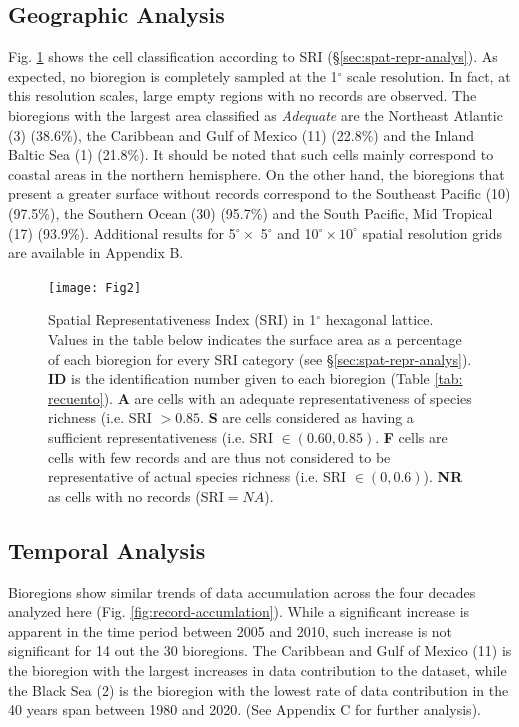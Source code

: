 \documentclass[12pt,authoryear]{elsarticle}
\begin{document}
\subsection{Geographic Analysis}

Fig. \ref{fig:cell_map} shows the cell classification according to SRI (\S \ref{sec:spat-repr-analys}). As expected, no bioregion is completely sampled at the 1$^\circ$ scale resolution. In fact, at this resolution scales, large empty regions with no records are observed. The bioregions with the largest area classified as \textit{Adequate} are the Northeast Atlantic (3) (38.6\%), the Caribbean and Gulf of Mexico (11) (22.8\%) and the Inland Baltic Sea (1) (21.8\%). It should be noted that such cells mainly correspond to coastal areas in the northern hemisphere. On the other hand, the bioregions that present a greater surface without records correspond to the Southeast Pacific (10) (97.5\%), the Southern Ocean (30) (95.7\%) and the South Pacific, Mid Tropical (17) (93.9\%). Additional results for 5$^\circ \times$ 5$^\circ$ and  10$^\circ\times 10^\circ$ spatial resolution grids are available in Appendix B.


\begin{figure}
  \centering
  \texttt{[image: Fig2]}
   \caption[]{Spatial Representativeness Index (SRI) in 1$^\circ$ hexagonal lattice. Values in the table below indicates the surface area as a percentage of each bioregion for every SRI category (see \S \ref{sec:spat-repr-analys}). \textbf{ID} is the identification number given to each bioregion (Table \ref{tab: recuento}). \textbf{A} are cells with an adequate representativeness of species richness (i.e. SRI $> 0.85$. \textbf{S} are cells considered as having a sufficient representativeness (i.e. SRI $\in (0.60,0.85)$. \textbf{F} cells are cells with  few records and are thus not considered to be representative of actual species richness (i.e. SRI $\in (0,0.6)$). \textbf{NR} as cells with no records (SRI$= NA$). 
  \label{fig:cell_map}}
\end{figure}

\subsection{Temporal Analysis}
\label{sec:temporal-analysis}
Bioregions show similar trends of data accumulation across the four decades analyzed here (Fig. \ref{fig:record-accumlation}). While a significant increase is apparent in the time period between 2005 and 2010, such increase is not significant for 14 out the 30 bioregions. The Caribbean and Gulf of Mexico (11) is the bioregion with the largest increases in data contribution to the dataset, while the Black Sea (2) is the bioregion with the lowest rate of data contribution in the 40 years span between 1980 and 2020. (See  Appendix C for further analysis).
\end{document}
